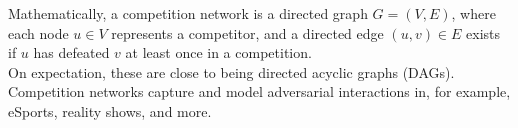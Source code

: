 \documentclass[preview]{standalone}
\begin{document}
Mathematically, a competition network is a directed graph $G = (V, E)$, where each node $u \in V$ represents a competitor, and a directed edge $(u, v) \in E$ exists if $u$ has defeated $v$ at least once in a competition.\\On expectation, these are close to being directed acyclic graphs (DAGs).\\Competition networks capture and model adversarial interactions in, for example, eSports, reality shows, and more.\\
\end{document}
